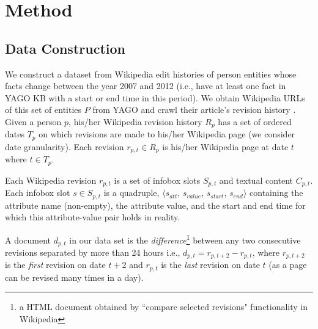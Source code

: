 \section{Method} \label{sec:method}

\subsection{Data Construction} \label{sec:data}
We construct a dataset from Wikipedia edit histories of person entities whose facts change between the year 2007 and 2012 (i.e., have at least one fact in YAGO KB \cite{suchanek2007yago} with a start or end time in this period). We obtain Wikipedia URLs of this set of entities $P$ from YAGO and crawl their article's revision history%
. Given a person $p$, his/her Wikipedia revision history $R_p$ has a set of ordered dates $T_p$ on which revisions are made to his/her Wikipedia page (we consider date granularity). Each revision $r_{p, t} \in R_p$ is his/her Wikipedia page at date $t$ where $t \in T_p$. 


Each Wikipedia revision $r_{p, t}$ is a set of infobox slots $S_{p, t}$ and textual content $C_{p, t}$. Each infobox slot $s \in S_{p, t}$ is a quadruple, $\langle s_{att}$, $s_{value}$,  $s_{start}$, $s_{end} \rangle$ containing the attribute name (non-empty), the attribute value, and the start and end time for which this attribute-value pair holds in reality. 

A document $d_{p, t}$ in our data set is the \textit{difference}\footnote{a HTML document obtained by ``compare selected revisions"  functionality in Wikipedia} between any two consecutive revisions separated by more than 24 hours i.e., $d_{p, t} = r_{p, t+2} - r_{p, t}$, where $r_{p, t+2}$ is the \textit{first} revision on date $t+2$ and $r_{p, {t}}$ is the \textit{last} revision on date $t$ (as a page can be revised many times in a day). 

